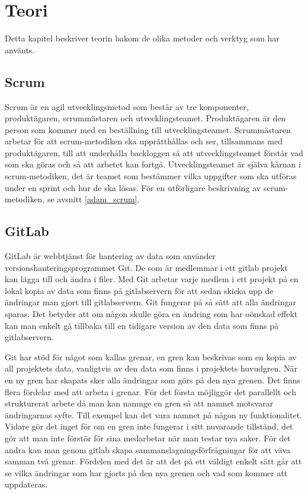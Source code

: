 \chapter{Teori}
Detta kapitel beskriver teorin bakom de olika metoder och verktyg som har använts.

\section{Scrum} \label{scrum}
Scrum är en agil utvecklingsmetod som består av tre komponenter, produktägaren, scrummästaren och utvecklingsteamet.
Produktägaren är den person som kommer med en beställning till utvecklingsteamet.
Scrummästaren arbetar för att scrum-metodiken ska upprätthållas och ser, tillsammans med produktägaren, till att underhålla backloggen så att utvecklingsteamet förstår vad som ska göras och så att arbetet kan fortgå.
Utvecklingsteamet är själva kärnan i scrum-metodiken, det är teamet som bestämmer vilka uppgifter som ska utföras under en sprint och hur de ska lösas.
För en utförligare beskrivning av scrum-metodiken, se avsnitt \ref{adam_scrum}.

\section{GitLab}
GitLab är webbtjänst för hantering av data som använder versionshanteringsprogrammet Git. De som är medlemmar i ett gitlab projekt kan lägga till och ändra i filer.
Med Git arbetar varje medlem i ett projekt på en lokal kopia av data som finns på gitlabservern för att sedan skicka upp de ändringar man gjort till gitlabservern. Git fungerar på så sätt att alla ändringar sparas. Det betyder att om någon skulle göra en ändring som har oönskad effekt kan man enkelt gå tillbaka till en tidigare version av den data som finns på gitlabservern.

Git har stöd för något som kallas grenar, en gren kan beskrivas som en kopia av all projektets data, vanligtvis av den data som finns i projektets huvudgren. När en ny gren har skapats sker alla ändringar som görs på den nya grenen. Det finns flera fördelar med att arbeta i grenar. För det första möjliggör det parallellt och strukturerat arbete då man kan namnge en gren så att namnet motsvarar ändringarnas syfte. Till exempel kan det vara namnet på någon ny funktionalitet. Vidare gör det inget för om en gren inte fungerar i sitt nuvarande tillstånd, det gör att man inte förstör för sina medarbetar när man testar nya saker. För det andra kan man genom gitlab skapa sammanslagningsförfrågningar för att väva samman två grenar. Fördelen med det är att det på ett väldigt enkelt sätt går att se vilka ändringar som har gjorts på den nya grenen och vad som kommer att uppdateras.

